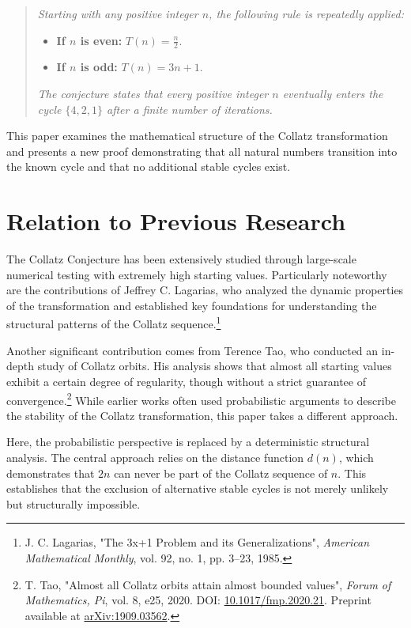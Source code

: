 \documentclass[a4paper,12pt]{article}
\begin{document}
\begin{quote}
\textit{Starting with any positive integer \( n \), the following rule is repeatedly applied:}
\begin{itemize}
    \item \textbf{If \( n \) is even:} \( T(n) = \frac{n}{2} \).
    \item \textbf{If \( n \) is odd:} \( T(n) = 3n + 1 \).
\end{itemize}
\textit{The conjecture states that every positive integer \( n \) eventually enters the cycle \( \{4, 2, 1\} \) after a finite number of iterations.}
\end{quote}

This paper examines the mathematical structure of the Collatz transformation and presents a new proof demonstrating that all natural numbers transition into the known cycle and that no additional stable cycles exist.

\section{Relation to Previous Research}
The Collatz Conjecture has been extensively studied through large-scale numerical testing with extremely high starting values. Particularly noteworthy are the contributions of Jeffrey C. Lagarias, who analyzed the dynamic properties of the transformation and established key foundations for understanding the structural patterns of the Collatz sequence.\footnote{J. C. Lagarias, "The 3x+1 Problem and its Generalizations", \textit{American Mathematical Monthly}, vol. 92, no. 1, pp. 3–23, 1985.} 

Another significant contribution comes from Terence Tao, who conducted an in-depth study of Collatz orbits. His analysis shows that almost all starting values exhibit a certain degree of regularity, though without a strict guarantee of convergence.\footnote{T. Tao, "Almost all Collatz orbits attain almost bounded values", \textit{Forum of Mathematics, Pi}, vol. 8, e25, 2020. DOI: \href{https://doi.org/10.1017/fmp.2020.21}{10.1017/fmp.2020.21}. Preprint available at \href{https://arxiv.org/abs/1909.03562}{arXiv:1909.03562}.} While earlier works often used probabilistic arguments to describe the stability of the Collatz transformation, this paper takes a different approach.

Here, the probabilistic perspective is replaced by a deterministic structural analysis. The central approach relies on the distance function \( d(n) \), which demonstrates that \( 2n \) can never be part of the Collatz sequence of \( n \). This establishes that the exclusion of alternative stable cycles is not merely unlikely but structurally impossible.
\end{document}
